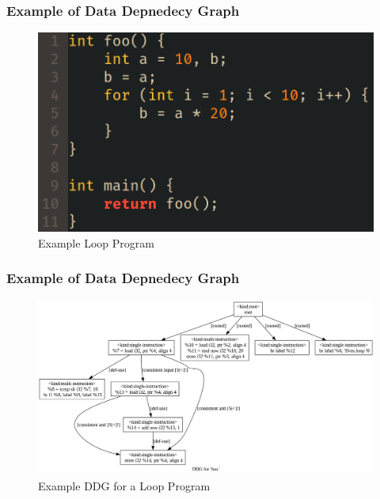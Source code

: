 \documentclass{beamer}
\begin{document}
\begin{frame}
    \frametitle{Example of Data Depnedecy Graph}
    \begin{figure}
        \centering
        \includegraphics[width=0.90\columnwidth]{source.png}
        \caption{Example Loop Program}
        \label{fig:source}
    \end{figure}
\end{frame}
\begin{frame}
    \frametitle{Example of Data Depnedecy Graph}
    \begin{figure}
        \centering
        \includegraphics[width=0.90\columnwidth]{ddg.png}
        \caption{Example DDG for a Loop Program}
        \label{fig:ddg}
    \end{figure}
\end{frame}
\end{document}
